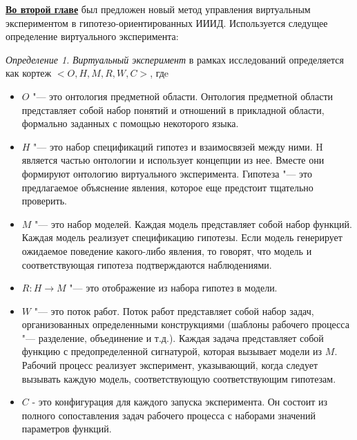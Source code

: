 \underline{\textbf{Во второй главе}} был предложен новый метод управления виртуальным экспериментом 
в гипотезо-ориентированных ИИИД. Используется следущее определение виртуального эксперимента:

 \textit{Определение 1.} \textit{Виртуальный эксперимент} в рамках исследований определяется как 
кортеж $<O, H, M, R, W, C>$, гдe
\begin{itemize}
    \item $O$ "--- это онтология предметной области. Онтология предметной области представляет собой набор понятий и 
            отношений в прикладной области, формально заданных с помощью некоторого языка.
    \item $H$ "--- это набор спецификаций гипотез и взаимосвязей между ними. H является частью онтологии и использует 
            концепции из нее. Вместе они формируют онтологию виртуального эксперимента. Гипотеза "--- это предлагаемое 
            объяснение явления, которое еще предстоит тщательно проверить. 
    \item $M$ "--- это набор моделей. Каждая модель представляет собой набор функций. Каждая модель реализует 
            спецификацию гипотезы. Если модель генерирует ожидаемое поведение какого-либо явления, то говорят, что 
            модель и соответствующая гипотеза подтверждаются наблюдениями.
    \item $R: H \to M$ "--- это отображение из набора гипотез в модели.
    \item $W$ "--- это поток работ. Поток работ представляет собой набор задач, организованных определенными 
            конструкциями (шаблоны рабочего процесса "--- разделение, объединение и т.д.). Каждая задача представляет 
            собой функцию с предопределенной сигнатурой, которая вызывает модели из $M$. Рабочий процесс реализует 
            эксперимент, указывающий, когда следует вызывать каждую модель, соответствующую соответствующим гипотезам. 
    \item $C$ - это конфигурация для каждого запуска эксперимента. Он состоит из полного сопоставления задач 
            рабочего процесса с наборами значений параметров функций.
\end{itemize}

